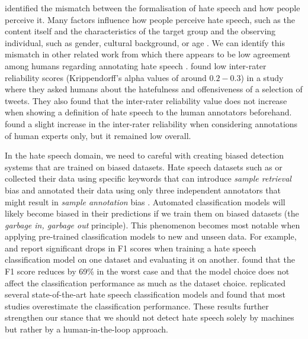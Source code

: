 %
\citet{balayn2021automatic} identified the mismatch between the formalisation of hate speech and how people perceive it.
%
Many factors influence how people perceive hate speech, such as the content itself and the characteristics of the target group and the observing individual, such as gender, cultural background, or age \citep{balayn2021automatic}.
%
We can identify this mismatch in other related work from which there appears to be low agreement among humans regarding annotating hate speech \citep{fortuna2018survey, ross2017measuring, waseem2016you}.
%
\citet{ross2017measuring} found low inter-rater reliability scores (Krippendorff's alpha values of around $0.2-0.3$) in a study where they asked humans about the hatefulness and offensiveness of a selection of tweets.
%
They also found that the inter-rater reliability value does not increase when showing a definition of hate speech to the human annotators beforehand.
%
\citet{waseem2016you} found a slight increase in the inter-rater reliability when considering annotations of human experts only, but it remained low overall.
%
%

%
In the hate speech domain, we need to careful with creating biased detection systems that are trained on biased datasets.
%
%
%
Hate speech datasets such as \citet{waseem2016hateful} or \citet{basile2019semeval} collected their data using specific keywords that can introduce \textit{sample retrieval} bias and annotated their data using only three independent annotators that might result in \textit{sample annotation} bias \citep{balayn2021automatic}.
%
Automated classification models will likely become biased in their predictions if we train them on biased datasets (the \emph{garbage in, garbage out} principle).
%
This phenomenon becomes most notable when applying pre-trained classification models to new and unseen data.
%
For example, \citet{grondahl2018all} and \citet{arango2019hate} report significant drops in F1 scores when training a hate speech classification model on one dataset and evaluating it on another.
%
\citet{grondahl2018all} found that the F1 score reduces by 69\% in the worst case and that the model choice does not affect the classification performance as much as the dataset choice.
%
\citet{arango2019hate} replicated several state-of-the-art hate speech classification models and found that most studies overestimate the classification performance.
%
These results further strengthen our stance that we should not detect hate speech solely by machines but rather by a human-in-the-loop approach.


